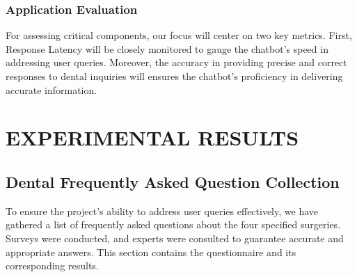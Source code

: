 \documentclass[12pt,oneside,openright,a4paper]{cpe-english-project}
\begin{document}
    \subsection{Application Evaluation}
      \qquad For assessing critical components, our focus will center on two key metrics. First, Response Latency will be closely monitored to gauge the chatbot’s speed in addressing user queries. Moreover, the accuracy in providing precise and correct responses to dental inquiries will ensures the chatbot's proficiency in delivering accurate information. \par


\chapter{EXPERIMENTAL RESULTS}
  \section{Dental Frequently Asked Question Collection}
    \qquad To ensure the project’s ability to address user queries effectively, we have gathered a list of frequently asked questions about the four specified surgeries. Surveys were conducted, and experts were consulted to guarantee accurate and appropriate answers. This section contains the questionnaire and its corresponding results. \par
\end{document}
